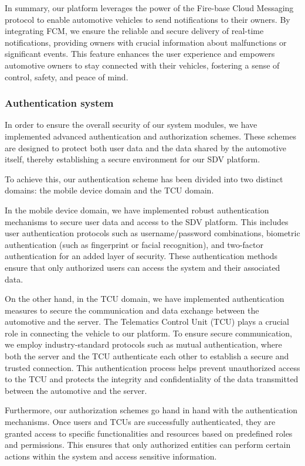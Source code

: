 \documentclass[
12pt,
oneside, 
onehalfspacing, 
nolistspacing, 
parskip, 
chapterinoneline, 
]{AASTCOMPUTER}
\begin{document}
In summary, our platform leverages the power of the Fire-base Cloud Messaging protocol to enable automotive vehicles to send notifications to their owners. By integrating FCM, we ensure the reliable and secure delivery of real-time notifications, providing owners with crucial information about malfunctions or significant events. This feature enhances the user experience and empowers automotive owners to stay connected with their vehicles, fostering a sense of control, safety, and peace of mind.

\subsubsection{Authentication system}
In order to ensure the overall security of our system modules, we have implemented advanced authentication and authorization schemes. These schemes are designed to protect both user data and the data shared by the automotive itself, thereby establishing a secure environment for our SDV platform. 

To achieve this, our authentication scheme has been divided into two distinct domains: the mobile device domain and the TCU domain. 

In the mobile device domain, we have implemented robust authentication mechanisms to secure user data and access to the SDV platform. This includes user authentication protocols such as username/password combinations, biometric authentication (such as fingerprint or facial recognition), and two-factor authentication for an added layer of security. These authentication methods ensure that only authorized users can access the system and their associated data.

On the other hand, in the TCU domain, we have implemented authentication measures to secure the communication and data exchange between the automotive and the server. The Telematics Control Unit (TCU) plays a crucial role in connecting the vehicle to our platform. To ensure secure communication, we employ industry-standard protocols such as mutual authentication, where both the server and the TCU authenticate each other to establish a secure and trusted connection. This authentication process helps prevent unauthorized access to the TCU and protects the integrity and confidentiality of the data transmitted between the automotive and the server.

Furthermore, our authorization schemes go hand in hand with the authentication mechanisms. Once users and TCUs are successfully authenticated, they are granted access to specific functionalities and resources based on predefined roles and permissions. This ensures that only authorized entities can perform certain actions within the system and access sensitive information.
\end{document}
